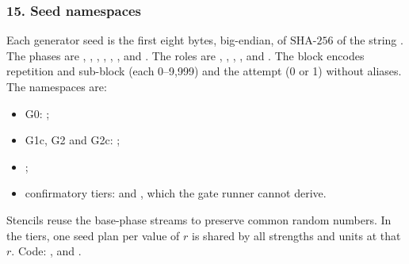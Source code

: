 \subsubsection*{15. Seed namespaces}
Each generator seed is the first eight bytes, big-endian, of $\mathrm{SHA\text{-}256}$ of the string . The phases are , , , , , ,  and . The roles are , , , ,  and . The block encodes repetition and sub-block (each 0--9,999) and the attempt (0 or 1) without aliases. The namespaces are:
\begin{itemize}
\item G0: ;
\item G1c, G2 and G2c: ;
\item {};
\item confirmatory tiers:  and , which the gate runner cannot derive.
\end{itemize}
Stencils reuse the base-phase streams to preserve common random numbers. In the tiers, one seed plan per value of $r$ is shared by all strengths and units at that $r$. Code: ,  and .

